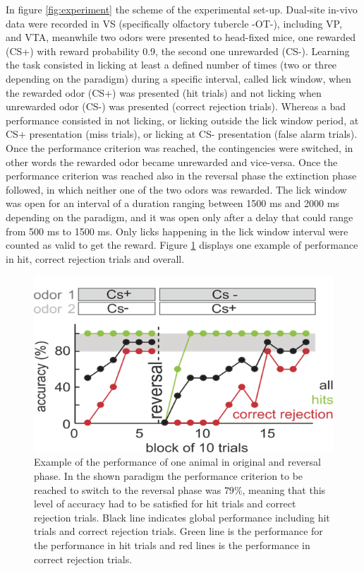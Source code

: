 \begin{framed}
In figure \ref{fig:experiment} the scheme of the experimental set-up. Dual-site in-vivo data were recorded in VS (specifically olfactory tubercle -OT-), including VP, and VTA, meanwhile two odors were presented to head-fixed mice, one rewarded (CS+) with reward probability 0.9, the second one unrewarded (CS-). Learning the task consisted in licking at least a defined number of times (two or three depending on the paradigm) during a specific interval, called lick window, when the rewarded odor (CS+) was presented (hit trials) and not licking when unrewarded odor (CS-) was presented (correct rejection trials). Whereas a bad performance consisted in not licking, or licking outside the lick window period, at CS+ presentation (miss trials), or licking at CS- presentation (false alarm trials). Once the performance criterion was reached, the contingencies were switched, in other words the rewarded odor became unrewarded and vice-versa. Once the performance criterion was reached also in the reversal phase the extinction phase followed, in which neither one of the two odors was rewarded. The lick window was open for an interval of a duration ranging between 1500 ms and 2000 ms depending on the paradigm, and it was open only after a delay that could range from 500 ms to 1500 ms. Only licks happening in the lick window interval were counted as valid to get the reward. Figure \ref{fig:performance} displays one example of performance in hit, correct rejection trials and overall.
\begin{figure}[H]
    \centering
\includegraphics[scale=0.8]{figures/Performance.png}
\caption{Example of the performance of one animal in original and reversal phase. In the shown paradigm the performance criterion to be reached to switch to the reversal phase was $79\%$, meaning that this level of accuracy had to be satisfied for hit trials and correct rejection trials. Black line indicates global performance including hit trials and correct rejection trials. Green line is the performance for the performance in hit trials and red lines is the performance in correct rejection trials.}
\label{fig:performance}
\end{figure}
\end{framed}
